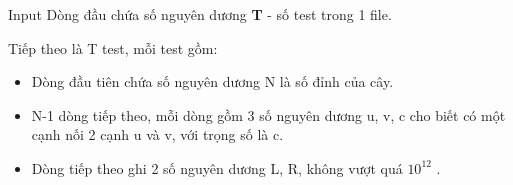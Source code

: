 Input
Dòng đầu chứa số nguyên dương   \textbf{    T   }   - số test trong 1 file.  

   Tiếp theo là T test, mỗi test gồm:  
\begin{itemize}
	\item     Dòng đầu tiên chứa số nguyên dương N là số đỉnh của cây.   
	\item     N-1 dòng tiếp theo, mỗi dòng gồm 3 số nguyên dương u, v, c cho biết có một cạnh nối 2 cạnh u và v, với trọng số là c.   
	\item     Dòng tiếp theo ghi 2 số nguyên dương L, R, không vượt quá $10^{12}$    .   
\end{itemize}